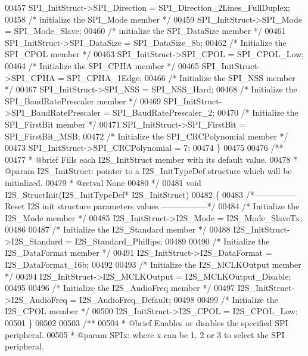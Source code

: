 \begin{DoxyCode}
00457   SPI\_InitStruct->SPI_Direction = SPI_Direction_2Lines_FullDuplex;
00458   \textcolor{comment}{/* initialize the SPI\_Mode member */}
00459   SPI\_InitStruct->SPI_Mode = SPI_Mode_Slave;
00460   \textcolor{comment}{/* initialize the SPI\_DataSize member */}
00461   SPI\_InitStruct->SPI_DataSize = SPI_DataSize_8b;
00462   \textcolor{comment}{/* Initialize the SPI\_CPOL member */}
00463   SPI\_InitStruct->SPI_CPOL = SPI_CPOL_Low;
00464   \textcolor{comment}{/* Initialize the SPI\_CPHA member */}
00465   SPI\_InitStruct->SPI_CPHA = SPI_CPHA_1Edge;
00466   \textcolor{comment}{/* Initialize the SPI\_NSS member */}
00467   SPI\_InitStruct->SPI_NSS = SPI_NSS_Hard;
00468   \textcolor{comment}{/* Initialize the SPI\_BaudRatePrescaler member */}
00469   SPI\_InitStruct->SPI_BaudRatePrescaler = SPI_BaudRatePrescaler_2;
00470   \textcolor{comment}{/* Initialize the SPI\_FirstBit member */}
00471   SPI\_InitStruct->SPI_FirstBit = SPI_FirstBit_MSB;
00472   \textcolor{comment}{/* Initialize the SPI\_CRCPolynomial member */}
00473   SPI\_InitStruct->SPI_CRCPolynomial = 7;
00474 \}
00475 
00476 \textcolor{comment}{/**}
00477 \textcolor{comment}{  * @brief  Fills each I2S\_InitStruct member with its default value.}
00478 \textcolor{comment}{  * @param  I2S\_InitStruct: pointer to a I2S\_InitTypeDef structure which will be initialized.}
00479 \textcolor{comment}{  * @retval None}
00480 \textcolor{comment}{  */}
00481 \textcolor{keywordtype}{void} I2S_StructInit(I2S\_InitTypeDef* I2S\_InitStruct)
00482 \{
00483 \textcolor{comment}{/*--------------- Reset I2S init structure parameters values -----------------*/}
00484   \textcolor{comment}{/* Initialize the I2S\_Mode member */}
00485   I2S\_InitStruct->I2S_Mode = I2S_Mode_SlaveTx;
00486 
00487   \textcolor{comment}{/* Initialize the I2S\_Standard member */}
00488   I2S\_InitStruct->I2S_Standard = I2S_Standard_Phillips;
00489 
00490   \textcolor{comment}{/* Initialize the I2S\_DataFormat member */}
00491   I2S\_InitStruct->I2S_DataFormat = I2S_DataFormat_16b;
00492 
00493   \textcolor{comment}{/* Initialize the I2S\_MCLKOutput member */}
00494   I2S\_InitStruct->I2S_MCLKOutput = I2S_MCLKOutput_Disable;
00495 
00496   \textcolor{comment}{/* Initialize the I2S\_AudioFreq member */}
00497   I2S\_InitStruct->I2S_AudioFreq = I2S_AudioFreq_Default;
00498 
00499   \textcolor{comment}{/* Initialize the I2S\_CPOL member */}
00500   I2S\_InitStruct->I2S_CPOL = I2S_CPOL_Low;
00501 \}
00502 
00503 \textcolor{comment}{/**}
00504 \textcolor{comment}{  * @brief  Enables or disables the specified SPI peripheral.}
00505 \textcolor{comment}{  * @param  SPIx: where x can be 1, 2 or 3 to select the SPI peripheral.}

\end{DoxyCode}
